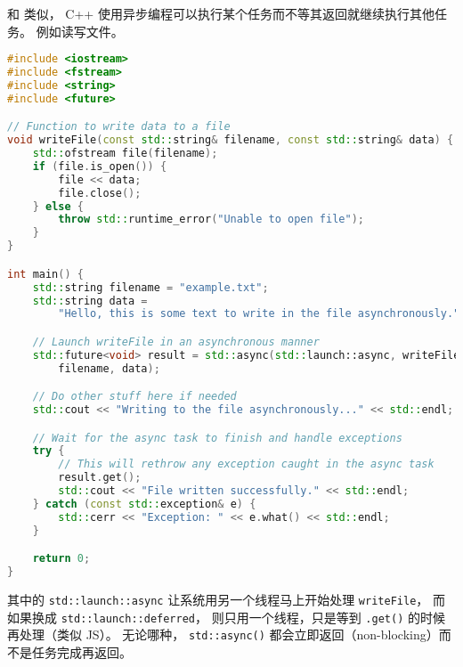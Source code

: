 
\begin{issues}
\issueDraft
\end{issues}

和 类似， C++ 使用异步编程可以执行某个任务而不等其返回就继续执行其他任务。 例如读写文件。

\begin{lstlisting}[language=cpp]
#include <iostream>
#include <fstream>
#include <string>
#include <future>

// Function to write data to a file
void writeFile(const std::string& filename, const std::string& data) {
    std::ofstream file(filename);
    if (file.is_open()) {
        file << data;
        file.close();
    } else {
        throw std::runtime_error("Unable to open file");
    }
}

int main() {
    std::string filename = "example.txt";
    std::string data =
        "Hello, this is some text to write in the file asynchronously.";

    // Launch writeFile in an asynchronous manner
    std::future<void> result = std::async(std::launch::async, writeFile,
        filename, data);

    // Do other stuff here if needed
    std::cout << "Writing to the file asynchronously..." << std::endl;

    // Wait for the async task to finish and handle exceptions
    try {
        // This will rethrow any exception caught in the async task
        result.get();
        std::cout << "File written successfully." << std::endl;
    } catch (const std::exception& e) {
        std::cerr << "Exception: " << e.what() << std::endl;
    }

    return 0;
}
\end{lstlisting}
其中的 \verb`std::launch::async` 让系统用另一个线程马上开始处理 \verb`writeFile`， 而如果换成 \verb`std::launch::deferred`， 则只用一个线程，只是等到 \verb`.get()` 的时候再处理（类似 JS）。 无论哪种， \verb`std::async()` 都会立即返回（non-blocking）而不是任务完成再返回。
